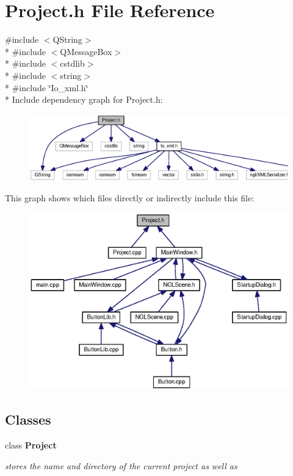 \section{Project.\-h File Reference}
\label{_project_8h}
{\ttfamily \#include $<$Q\-String$>$}\\*
{\ttfamily \#include $<$Q\-Message\-Box$>$}\\*
{\ttfamily \#include $<$cstdlib$>$}\\*
{\ttfamily \#include $<$string$>$}\\*
{\ttfamily \#include \char`\"{}Io\-\_\-xml.\-h\char`\"{}}\\*
Include dependency graph for Project.\-h\-:\nopagebreak
\begin{figure}[H]
\begin{center}
\leavevmode
\includegraphics[width=350pt]{_project_8h__incl}
\end{center}
\end{figure}
This graph shows which files directly or indirectly include this file\-:\nopagebreak
\begin{figure}[H]
\begin{center}
\leavevmode
\includegraphics[width=350pt]{_project_8h__dep__incl}
\end{center}
\end{figure}
\subsection*{Classes}
\begin{DoxyCompactItemize}
\item 
class {\bf Project}
\begin{DoxyCompactList}\small\item\em stores the name and directory of the current project as well as \end{DoxyCompactList}\end{DoxyCompactItemize}
